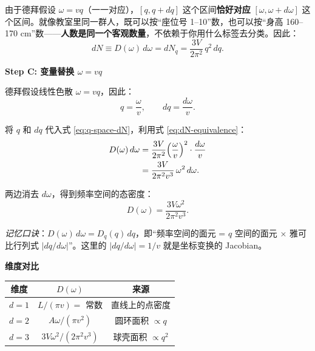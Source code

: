 \begin{warnbox}
由于德拜假设 $\omega=vq$（一一对应），$[q,q+dq]$ 这个区间\textbf{恰好对应} $[\omega,\omega+d\omega]$ 这个区间。就像教室里同一群人，既可以按``座位号 1--10''数，也可以按``身高 160--170 cm''数——\textbf{人数是同一个客观数量}，不依赖于你用什么标签去分类。因此：
\begin{equation}
\boxed{dN \equiv D(\omega)\,d\omega = dN_q = \frac{3V}{2\pi^2}\,q^2\,dq.}
\label{eq:dN-equivalence}
\end{equation}

\textbf{Step C: 变量替换 $\omega=vq$}

德拜假设线性色散 $\omega=vq$，因此：
\begin{equation}
q = \frac{\omega}{v}, \qquad dq = \frac{d\omega}{v}.
\end{equation}

将 $q$ 和 $dq$ 代入式 \eqref{eq:q-space-dN}，利用式 \eqref{eq:dN-equivalence}：
\begin{align}
D(\omega)\,d\omega &= \frac{3V}{2\pi^2}\Bigl(\frac{\omega}{v}\Bigr)^2\cdot\frac{d\omega}{v} \nonumber\\
&= \frac{3V}{2\pi^2v^3}\,\omega^2\,d\omega.
\end{align}

两边消去 $d\omega$，得到频率空间的态密度：
\begin{equation}
\boxed{D(\omega) = \frac{3V\omega^2}{2\pi^2v^3}.}
\end{equation}

\textit{记忆口诀}：$D(\omega)\,d\omega = D_q(q)\,dq$，即``频率空间的面元 = $q$ 空间的面元 × 雅可比行列式 $|dq/d\omega|$''。这里的 $|dq/d\omega|=1/v$ 就是坐标变换的 Jacobian。

\textbf{维度对比}
\begin{center}
\begin{tabular}{ccc}
\toprule
维度 & $D(\omega)$ & 来源 \\
\midrule
$d=1$ & $L/(\pi v)=$ 常数 & 直线上的点密度 \\
$d=2$ & $A\omega/(\pi v^2)$ & 圆环面积 $\propto q$ \\
$d=3$ & $3V\omega^2/(2\pi^2v^3)$ & 球壳面积 $\propto q^2$ \\
\bottomrule
\end{tabular}
\end{center}
\end{warnbox}

